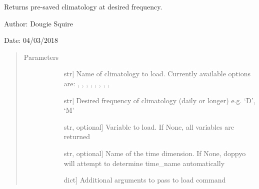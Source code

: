 \documentclass[letterpaper,10pt,english]{sphinxmanual}
\begin{document}
\begin{fulllineitems}
\label{\detokenize{utils_doc:utils.load_mean_climatology}}
Returns pre-saved climatology at desired frequency.

\begin{DUlineblock}{0em}
\item[] Author: Dougie Squire
\item[] Date: 04/03/2018
\end{DUlineblock}
\begin{quote}\begin{description}
\item[{Parameters}] \leavevmode\begin{description}
\item[{}] \leavevmode{[}str{]}
Name of climatology to load. Currently available options are: ,                     , , ,                     , , ,                     , 

\item[{}] \leavevmode{[}str{]}
Desired frequency of climatology (daily or longer) e.g. ‘D’, ‘M’

\item[{}] \leavevmode{[}str, optional{]}
Variable to load. If None, all variables are returned

\item[{}] \leavevmode{[}str, optional{]}
Name of the time dimension. If None, doppyo will attempt to determine time\_name                     automatically

\item[{}] \leavevmode{[}dict{]}
Additional arguments to pass to load command

\end{description}


\end{description}
\end{quote}
\end{fulllineitems}
\end{document}
